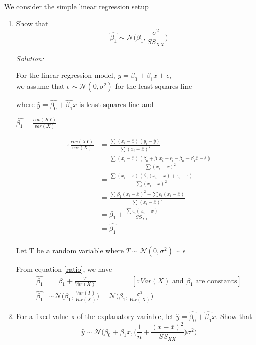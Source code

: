 \documentclass[12pt,letterpaper, fleqn]{article}
\begin{document}
We consider the simple linear regression setup

\begin{enumerate}
  \item Show that 
  $$ \hat{\beta_1} \sim \mathcal{N}\biggl(\beta_1, \frac{\sigma^2}{SS_{XX}}\biggr) $$

  \textit{Solution:}
  \begin{flushleft}
    For the linear regression model, $y = \beta_0 + \beta_1x + \epsilon$,\\
    we assume that $\epsilon \sim \mathcal{N}(0, \sigma^2)$ for the least squares line

    where $\hat{y} = \hat{\beta_0} + \hat{\beta_1}x$ is least squares line and
    
    \hspace{2.4em}
    $\hat{\beta_1} = \frac{cov(XY)}{var(X)}$

    \begin{equation}
      \begin{split}
        \therefore \frac{cov(XY)}{var(X)} &= \frac{\sum (x_i - \overline{x})(y_i - \overline{y})}{\sum (x_i - \overline{x})^2}\\
        &= \frac{\sum (x_i - \overline{x})(\beta_0 + \beta_1x_i + \epsilon_i - \beta_0 - \beta_1\overline{x} - \overline{\epsilon})}{\sum (x_i - \overline{x})^2}\\
        &= \frac{\sum (x_i - \overline{x})(\beta_1(x_i - \overline{x}) + \epsilon_i - \overline{\epsilon})}{\sum (x_i - \overline{x})^2}\\
        &= \frac{\sum \beta_1(x_i - \overline{x})^2 + \sum \epsilon_i(x_i - \overline{x})}{\sum (x_i - \overline{x})^2}\\
        &= \beta_1 + \frac{\sum \epsilon_i(x_i - \overline{x})}{SS_{XX}}\\
        &= \hat{\beta_1}\\
      \end{split}
      \label{ratio}
    \end{equation}

    Let T be a random variable where $T \sim \mathcal{N}(0, \sigma^2) \sim \epsilon$

    From equation \ref{ratio}, we have
    \begin{equation}
      \begin{split}
        \hat{\beta_1} &= \beta_1 + \frac{T}{Var(X)} \hspace{5em} [\because Var(X)\text{ and }\beta_1\text{ are constants}]\\
        \hat{\beta_1} &\sim \mathcal{N}\biggl(\beta_1, \frac{Var(T)}{Var(X)}\biggr) = \mathcal{N}\biggl(\beta_1, \frac{\sigma^2}{Var(X)}\biggr)
      \end{split}
    \end{equation}
  \end{flushleft}
  \newpage
  \item For a fixed value x of the explanatory variable, let $\hat{y} = \hat{\beta_0} + \hat{\beta_1}x$. Show that
  $$\hat{y} \sim \mathcal{N}\biggl(\beta_0 + \beta_1x, \biggl(\frac{1}{n} + \frac{(x-\overline{x})^2}{SS_{XX}}\biggr)\sigma^2 \biggr)$$


\end{enumerate}
\end{document}
